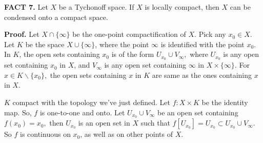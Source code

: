 \documentclass{article}
\begin{document}
\textbf{FACT 7.} Let $X$ be a Tychonoff space. If $X$ is locally compact, then $X$ can be condensed onto a compact space. 

\vskip 15pt


\textbf{Proof.} Let $X\cap \{\infty\}$ be the one-point compactification of $X$. Pick any $x_0\in X$. Let $K$ be the space $X\cup \{\infty\}$, where the point $\infty$ is identified with the point $x_0$. In $K$, the open sets containing $x_0$ is of the form $U_{x_0} \cup V_{\infty},$ where $U_{x_0}$ is any open set containing $x_0$ in $X$, and $V_\infty$ is any open set containing $\infty$ in $X\times \{\infty\}.$ For $x\in K\backslash \{x_0\},$ the open sets containing $x$ in $K$ are same as the ones containing $x$ in $X$. 
\vskip 10pt

$K$ compact with the topology we've just defined. Let $f:X\times K$ be the identity map. So, $f$ is one-to-one and onto. Let $U_{x_0}\cup V_\infty$ be an open set containing $f(x_0)=x_0,$ then $U_{x_0}$ is an open set in $X$ such that
$f\left[U_{x_0}\right]=U_{x_0}\subset U_{x_0}\cup V_\infty.$  So $f$ is continuous on $x_0$, as well as on other points of $X$. 
\end{document}
